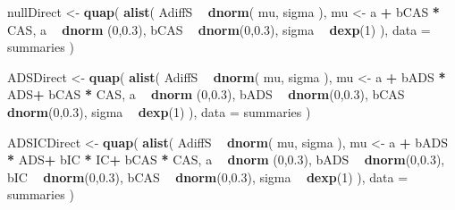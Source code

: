\documentclass[10pt,dvipsnames,enabledeprecatedfontcommands]{scrartcl}
\newenvironment{Shaded}{\begin{snugshade}}{\end{snugshade}}
\newcommand{\KeywordTok}[1]{\textcolor[rgb]{0.13,0.29,0.53}{\textbf{#1}}}
\newcommand{\DataTypeTok}[1]{\textcolor[rgb]{0.13,0.29,0.53}{#1}}
\newcommand{\DecValTok}[1]{\textcolor[rgb]{0.00,0.00,0.81}{#1}}
\newcommand{\FloatTok}[1]{\textcolor[rgb]{0.00,0.00,0.81}{#1}}
\newcommand{\StringTok}[1]{\textcolor[rgb]{0.31,0.60,0.02}{#1}}
\newcommand{\OperatorTok}[1]{\textcolor[rgb]{0.81,0.36,0.00}{\textbf{#1}}}
\newcommand{\NormalTok}[1]{#1}
\begin{document}
\begin{Shaded}
\begin{Highlighting}[]
\NormalTok{nullDirect <-}\StringTok{ }\KeywordTok{quap}\NormalTok{(}
  \KeywordTok{alist}\NormalTok{(}
\NormalTok{    AdiffS }\OperatorTok{~}\StringTok{ }\KeywordTok{dnorm}\NormalTok{( mu, sigma ),}
\NormalTok{    mu <-}\StringTok{ }\NormalTok{a }\OperatorTok{+}\StringTok{ }\NormalTok{bCAS }\OperatorTok{*}\StringTok{ }\NormalTok{CAS,}
\NormalTok{    a }\OperatorTok{~}\StringTok{ }\KeywordTok{dnorm}\NormalTok{ (}\DecValTok{0}\NormalTok{,}\FloatTok{0.3}\NormalTok{),}
\NormalTok{    bCAS }\OperatorTok{~}\StringTok{ }\KeywordTok{dnorm}\NormalTok{(}\DecValTok{0}\NormalTok{,}\FloatTok{0.3}\NormalTok{),}
\NormalTok{    sigma  }\OperatorTok{~}\StringTok{ }\KeywordTok{dexp}\NormalTok{(}\DecValTok{1}\NormalTok{)}
\NormalTok{  ), }
  \DataTypeTok{data =}\NormalTok{ summaries  }
\NormalTok{)}

\NormalTok{ADSDirect <-}\StringTok{ }\KeywordTok{quap}\NormalTok{(}
  \KeywordTok{alist}\NormalTok{(}
\NormalTok{    AdiffS }\OperatorTok{~}\StringTok{ }\KeywordTok{dnorm}\NormalTok{( mu, sigma ),}
\NormalTok{    mu <-}\StringTok{  }\NormalTok{a }\OperatorTok{+}\StringTok{ }\NormalTok{bADS }\OperatorTok{*}\StringTok{ }\NormalTok{ADS}\OperatorTok{+}\StringTok{ }\NormalTok{bCAS }\OperatorTok{*}\StringTok{ }\NormalTok{CAS,}
\NormalTok{    a }\OperatorTok{~}\StringTok{ }\KeywordTok{dnorm}\NormalTok{ (}\DecValTok{0}\NormalTok{,}\FloatTok{0.3}\NormalTok{),}
\NormalTok{    bADS }\OperatorTok{~}\StringTok{ }\KeywordTok{dnorm}\NormalTok{(}\DecValTok{0}\NormalTok{,}\FloatTok{0.3}\NormalTok{),}
\NormalTok{    bCAS }\OperatorTok{~}\StringTok{ }\KeywordTok{dnorm}\NormalTok{(}\DecValTok{0}\NormalTok{,}\FloatTok{0.3}\NormalTok{),}
\NormalTok{    sigma  }\OperatorTok{~}\StringTok{ }\KeywordTok{dexp}\NormalTok{(}\DecValTok{1}\NormalTok{)}
\NormalTok{  ), }
  \DataTypeTok{data =}\NormalTok{ summaries}
\NormalTok{)}

\NormalTok{ADSICDirect <-}\StringTok{ }\KeywordTok{quap}\NormalTok{(}
  \KeywordTok{alist}\NormalTok{(}
\NormalTok{    AdiffS }\OperatorTok{~}\StringTok{ }\KeywordTok{dnorm}\NormalTok{( mu, sigma ),}
\NormalTok{    mu <-}\StringTok{  }\NormalTok{a }\OperatorTok{+}\StringTok{ }\NormalTok{bADS }\OperatorTok{*}\StringTok{ }\NormalTok{ADS}\OperatorTok{+}\StringTok{ }\NormalTok{bIC }\OperatorTok{*}\StringTok{ }\NormalTok{IC}\OperatorTok{+}\StringTok{ }\NormalTok{bCAS }\OperatorTok{*}\StringTok{ }\NormalTok{CAS,}
\NormalTok{    a }\OperatorTok{~}\StringTok{ }\KeywordTok{dnorm}\NormalTok{ (}\DecValTok{0}\NormalTok{,}\FloatTok{0.3}\NormalTok{),}
\NormalTok{    bADS }\OperatorTok{~}\StringTok{ }\KeywordTok{dnorm}\NormalTok{(}\DecValTok{0}\NormalTok{,}\FloatTok{0.3}\NormalTok{),}
\NormalTok{    bIC }\OperatorTok{~}\StringTok{ }\KeywordTok{dnorm}\NormalTok{(}\DecValTok{0}\NormalTok{,}\FloatTok{0.3}\NormalTok{),}
\NormalTok{    bCAS }\OperatorTok{~}\StringTok{ }\KeywordTok{dnorm}\NormalTok{(}\DecValTok{0}\NormalTok{,}\FloatTok{0.3}\NormalTok{),}
\NormalTok{    sigma  }\OperatorTok{~}\StringTok{ }\KeywordTok{dexp}\NormalTok{(}\DecValTok{1}\NormalTok{)}
\NormalTok{  ), }
  \DataTypeTok{data =}\NormalTok{ summaries}
\NormalTok{)}


\end{Highlighting}
\end{Shaded}
\end{document}
